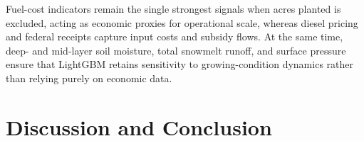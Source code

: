 \documentclass[twocolumn]{article}
\begin{document}
\begin{table}[htb]
\centering
\caption{Top 15 LightGBM Feature Importances (No-Acres Configuration)}
\label{tab:feature_importance}
\end{table}

Fuel-cost indicators remain the single strongest signals when acres planted is excluded, acting as economic proxies for operational scale, whereas diesel pricing and federal receipts capture input costs and subsidy flows. At the same time, deep- and mid-layer soil moisture, total snowmelt runoff, and surface pressure ensure that LightGBM retains sensitivity to growing-condition dynamics rather than relying purely on economic data.

\section{Discussion and Conclusion}
\end{document}

